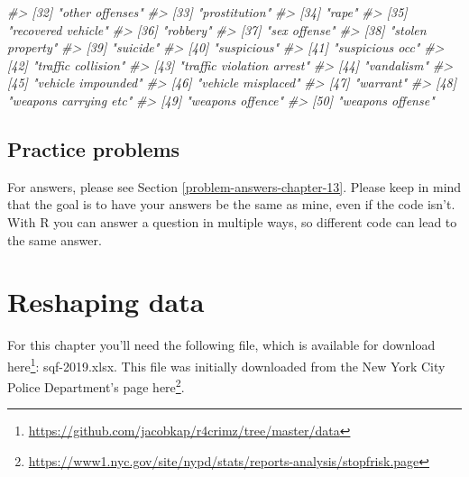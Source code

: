 \documentclass[
]{krantz}
\makeatletter
\newenvironment{Shaded}{\begin{snugshade}}{\end{snugshade}}
\newcommand{\CommentTok}[1]{\textcolor[rgb]{0.37,0.37,0.37}{\textit{#1}}}
\renewcommand{\href}[2]{#2\footnote{\url{#1}}}
\newenvironment{kframe}{%
\medskip{}
\setlength{\fboxsep}{.8em}
 \def\at@end@of@kframe{}%
 \ifinner\ifhmode%
  \def\at@end@of@kframe{\end{minipage}}%
  \begin{minipage}{\columnwidth}%
 \fi\fi%
 \def\FrameCommand##1{\hskip\@totalleftmargin \hskip-\fboxsep
 \colorbox{shadecolor}{##1}\hskip-\fboxsep
     \hskip-\linewidth \hskip-\@totalleftmargin \hskip\columnwidth}%
 \MakeFramed {\advance\hsize-\width
   \@totalleftmargin\z@ \linewidth\hsize
   \@setminipage}}%
 {\par\unskip\endMakeFramed%
 \at@end@of@kframe}
\renewenvironment{Shaded}{\begin{kframe}}{\end{kframe}}
\makeatother
\begin{document}
\begin{Shaded}
\begin{Highlighting}[]
\CommentTok{\#\textgreater{} [32] "other offenses"                            }
\CommentTok{\#\textgreater{} [33] "prostitution"                              }
\CommentTok{\#\textgreater{} [34] "rape"                                      }
\CommentTok{\#\textgreater{} [35] "recovered vehicle"                         }
\CommentTok{\#\textgreater{} [36] "robbery"                                   }
\CommentTok{\#\textgreater{} [37] "sex offense"                               }
\CommentTok{\#\textgreater{} [38] "stolen property"                           }
\CommentTok{\#\textgreater{} [39] "suicide"                                   }
\CommentTok{\#\textgreater{} [40] "suspicious"                                }
\CommentTok{\#\textgreater{} [41] "suspicious occ"                            }
\CommentTok{\#\textgreater{} [42] "traffic collision"                         }
\CommentTok{\#\textgreater{} [43] "traffic violation arrest"                  }
\CommentTok{\#\textgreater{} [44] "vandalism"                                 }
\CommentTok{\#\textgreater{} [45] "vehicle impounded"                         }
\CommentTok{\#\textgreater{} [46] "vehicle misplaced"                         }
\CommentTok{\#\textgreater{} [47] "warrant"                                   }
\CommentTok{\#\textgreater{} [48] "weapons carrying etc"                      }
\CommentTok{\#\textgreater{} [49] "weapons offence"                           }
\CommentTok{\#\textgreater{} [50] "weapons offense"}
\end{Highlighting}
\end{Shaded}

\hypertarget{practice-problems-6}{%
\section{Practice problems}\label{practice-problems-6}}

For answers, please see Section \ref{problem-answers-chapter-13}. Please keep in mind that the goal is to have your answers be the same as mine, even if the code isn't. With R you can answer a question in multiple ways, so different code can lead to the same answer.

\hypertarget{reshaping}{%
\chapter{Reshaping data}\label{reshaping}}

For this chapter you'll need the following file, which is available for download \href{https://github.com/jacobkap/r4crimz/tree/master/data}{here}: sqf-2019.xlsx. This file was initially downloaded from the New York City Police Department's page \href{https://www1.nyc.gov/site/nypd/stats/reports-analysis/stopfrisk.page}{here}.
\end{document}

